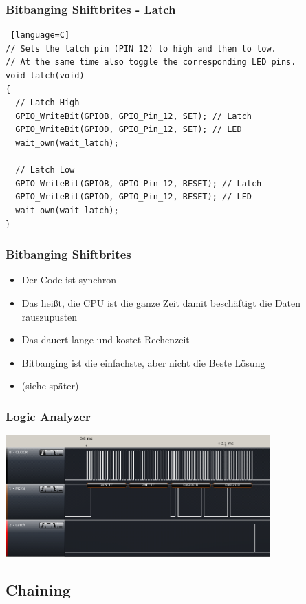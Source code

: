 \documentclass[ngerman,compress]{beamer}
\begin{document}
\begin{frame} [fragile]
	\frametitle{Bitbanging Shiftbrites - Latch}
	\begin{lstlisting} [language=C]
// Sets the latch pin (PIN 12) to high and then to low.
// At the same time also toggle the corresponding LED pins.
void latch(void)
{
  // Latch High
  GPIO_WriteBit(GPIOB, GPIO_Pin_12, SET); // Latch
  GPIO_WriteBit(GPIOD, GPIO_Pin_12, SET); // LED
  wait_own(wait_latch);

  // Latch Low
  GPIO_WriteBit(GPIOB, GPIO_Pin_12, RESET); // Latch
  GPIO_WriteBit(GPIOD, GPIO_Pin_12, RESET); // LED
  wait_own(wait_latch);
}
	\end{lstlisting}
\end{frame}

\begin{frame} [fragile]
	\frametitle{Bitbanging Shiftbrites}
	\begin{itemize}
		\item Der Code ist synchron
		\item Das heißt, die CPU ist die ganze Zeit damit beschäftigt die Daten rauszupusten
		\item Das dauert lange und kostet Rechenzeit
		\item Bitbanging ist die einfachste, aber nicht die Beste Lösung
		\item (siehe später)
	\end{itemize}
\end{frame}

\begin{frame} [fragile]
	\frametitle{Logic Analyzer}
        \includegraphics[width=4in]{dump_bitbanging.png}
\end{frame}


\subsection{Chaining}
\end{document}
